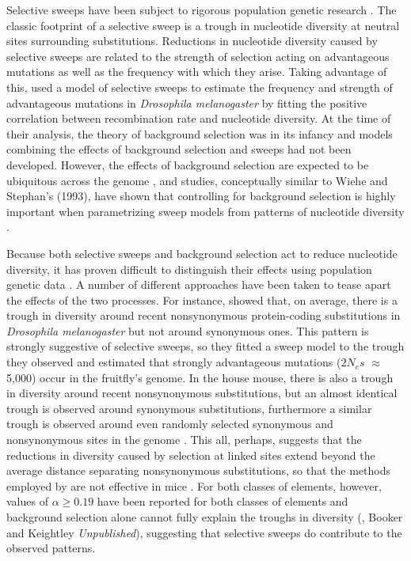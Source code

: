\documentclass[11pt]{article}
\begin{document}
Selective sweeps have been subject to rigorous population genetic research \citep{RN124, RN226, RN278, RN235}. The classic footprint of a selective sweep is a trough in nucleotide diversity at neutral sites surrounding substitutions. Reductions in nucleotide diversity caused by selective sweeps are related to the strength of selection acting on advantageous mutations as well as the frequency with which they arise. Taking advantage of this, \cite{RN277} used a model of selective sweeps to estimate the frequency and strength of advantageous mutations in \textit{Drosophila melanogaster} by fitting the positive correlation between recombination rate and nucleotide diversity. At the time of their analysis, the theory of background selection was in its infancy and models combining the effects of background selection and sweeps had not been developed. However, the effects of background selection are expected to be ubiquitous across the genome \citep{RN116, RN274, RN120}, and studies, conceptually similar to Wiehe and Stephan's (1993), have shown that controlling for background selection is highly important when parametrizing sweep models from patterns of nucleotide diversity \citep{RN323, RN274}.

Because both selective sweeps and background selection act to reduce nucleotide diversity, it has proven difficult to distinguish their effects using population genetic data \citep{RN339}. A number of different approaches have been taken to tease apart the effects of the two processes. For instance, \cite{RN167} showed that, on average, there is a trough in diversity around recent nonsynonymous protein-coding substitutions in \textit{Drosophila melanogaster} but not around synonymous ones. This pattern is strongly suggestive of selective sweeps, so they \citep{RN167} fitted a sweep model to the trough they observed and estimated that strongly advantageous mutations ($2N_es$ $\approx$ 5,000) occur in the fruitfly's genome.  In the house mouse, there is also a trough in diversity around recent nonsynonymous substitutions, but an almost identical trough is observed around synonymous substitutions, furthermore a similar trough is observed around even randomly selected synonymous and nonsynonymous sites in the genome \citep{RN122}. This all, perhaps, suggests that the reductions in diversity caused by selection at linked sites extend beyond the average distance separating nonsynonymous substitutions, so that the methods employed by \cite{RN167} are not effective in mice \citep{RN122}. For both classes of elements, however, values of $\alpha \geq 0.19$ have been reported for both classes of elements \citep{RN122} and background selection alone cannot fully explain the troughs in diversity (\citealt{RN122}, Booker and Keightley \textit{Unpublished}), suggesting that selective sweeps do contribute to the observed patterns.
\end{document}
